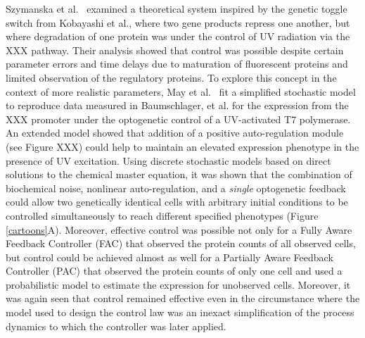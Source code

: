 \documentclass[12pt]{article}
\begin{document}
Szymanska et al.~\cite{Szymanska2015} examined a theoretical system inspired by the genetic toggle switch from Kobayashi et al.\cite{Kobayashi:2004}, where two gene products repress one another, but where degradation of one protein was under the control of UV radiation via the XXX pathway. Their analysis showed that control was possible despite certain parameter errors and time delays due to maturation of fluorescent proteins and limited observation of the regulatory proteins. 
To explore this concept in the context of more realistic parameters, May et al.~\cite{May2021} fit a simplified stochastic model to reproduce data measured in Baumschlager, et al.\cite{} for the expression from the XXX promoter under the optogenetic control of a UV-activated T7 polymerase. An extended model showed that addition of a positive auto-regulation module (see Figure XXX) could help to maintain an elevated expression phenotype in the presence of UV excitation. Using discrete stochastic models based on direct solutions to the chemical master equation, it was shown that   the combination of biochemical noise, nonlinear auto-regulation, and a {\em single} optogenetic feedback could allow two genetically identical cells with arbitrary initial conditions to be controlled simultaneously to reach different specified phenotypes (Figure \ref{cartoons}A). Moreover, effective control was possible not only for a Fully Aware Feedback Controller (FAC) that observed the protein counts of all observed cells, but control could be achieved almost as well for a Partially Aware Feedback Controller (PAC) that observed the protein counts of only one cell and used a probabilistic model to estimate the expression for unobserved cells. Moreover, it was again seen that control remained effective even in the circumstance where the model used to design the control law was an inexact simplification of the process dynamics to which the controller was later applied.  
\end{document}
